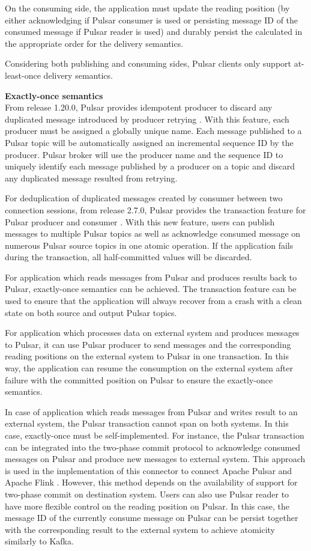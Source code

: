 On the consuming side, the application must update the reading position (by either acknowledging if Pulsar consumer is used or persisting message ID of the consumed message if Pulsar reader is used) and durably persist the calculated in the appropriate order for the delivery semantics.

Considering both publishing and consuming sides, Pulsar clients only support at-least-once delivery semantics.

\textbf{Exactly-once semantics}\\
From release 1.20.0, Pulsar provides idempotent producer to discard any duplicated message introduced by producer retrying \cite{pulsaridemproducer}. With this feature, each producer must be assigned a globally unique name. Each message published to a Pulsar topic will be automatically assigned an incremental sequence ID by the producer. Pulsar broker will use the producer name and the sequence ID to uniquely identify each message published by a producer on a topic and discard any duplicated message resulted from retrying. 

For deduplication of duplicated messages created by consumer between two connection sessions, from release 2.7.0, Pulsar provides the transaction feature for Pulsar producer and consumer \cite{pulsartransaction}. With this new feature, users can publish messages to multiple Pulsar topics as well as acknowledge consumed message on numerous Pulsar source topics in one atomic operation. If the application fails during the transaction, all half-committed values will be discarded.  

For application which reads messages from Pulsar and produces results back to Pulsar, exactly-once semantics can be achieved. The transaction feature can be used to ensure that the application will always recover from a crash with a clean state on both source and output Pulsar topics.   

For application which processes data on external system and produces messages to Pulsar, it can use Pulsar producer to send messages and the corresponding reading positions on the external system to Pulsar in one transaction.  In this way, the application can resume the consumption on the external system after failure with the committed position on Pulsar to ensure the exactly-once semantics. 

In case of application which reads messages from Pulsar and writes result to an external system, the Pulsar transaction cannot span on both systems. In this case, exactly-once must be self-implemented. For instance, the Pulsar transaction can be integrated into the two-phase commit protocol \cite{twophasecommit} to acknowledge consumed messages on Pulsar and produce new messages to external system. This approach is used in the implementation of this connector to connect Apache Pulsar and Apache Flink \cite{pulsarflinkconnector}. However, this method depends on the availability of support for two-phase commit on destination system. Users can also use Pulsar reader to have more flexible control on the reading position on Pulsar. In this case, the message ID of the currently consume message on Pulsar can be persist together with the corresponding result to the external system to achieve atomicity similarly to Kafka.

